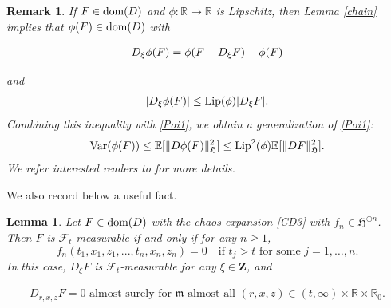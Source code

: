 \documentclass[letterpaper, 11pt,  reqno]{amsart}
\newtheorem{lemma}[theorem]{Lemma}
\newtheorem{remark}[theorem]{Remark}
\newcommand{\noi}{\noindent}
\newcommand{\R}{\mathbb{R}}
\newcommand{\bE}{\mathbb{E}}
\newcommand{\E}{\mathbb{E}}
\newcommand{\Lip}{\textup{Lip}}
\newcommand{\Var}{\textup{Var}}
\newcommand{\fm}{\mathfrak{m}}
\newcommand{\fH}{\mathfrak{H}}
\newcommand{\dom}{\textup{dom}}
\numberwithin{equation}{section}
\numberwithin{theorem}{section}
\begin{document}
\begin{remark}
 \label{rem_BZ-iii}
 \rm
If $F  \in\dom(D)$ and $\phi: \R\to\R$ is Lipschitz, then Lemma \ref{chain} implies that
 $\phi(F)\in\dom(D)$ with
 
 \noi
\begin{align}   \notag %
D_\xi \phi(F)=\phi(F+D_\xi F)-\phi(F) 
\end{align}

\noi
and 
\begin{align}\label{add1b}
|D_\xi \phi(F)| \leq  \Lip(\phi)| D_\xi F|.
\end{align}
Combining this inequality with \eqref{Poi1}, we obtain a generalization of \eqref{Poi1}:
\begin{align}   \notag %
\Var  ( \phi(F)  ) \leq  \bE[\|D \phi(F)\|_{\fH}^2]\leq \textup{Lip}^2(\phi) \E [ \| DF \|_\fH^2  ].
\end{align}
We refer  interested readers to \cite[Remark 2.7]{BZ23} for more details.





\end{remark}

We also record below a useful fact. 

\begin{lemma}


\label{rem_BZ-iv}
Let $F\in\dom(D)$ with the chaos expansion \eqref{CD3} with $f_n \in \fH^{\odot n}$.
 Then $F$ is $\mathcal{F}_t$-measurable if and only if for any $n\geq 1$, 
 \begin{equation}
 \label{fn-zero}
 f_n( t_1, x_1, z_1, ..., t_n, x_n, z_n) = 0 \quad\text{if $t_j > t$ for some $j=1,\ldots,n$.}
 \end{equation}
In this case,  $D_\xi F$ is $\mathcal{F}_t$-measurable for any $\xi \in \mathbf{Z} $, and

\noi
\begin{align} \label{D-zero}
D_{r,x,z}F=0  \,\, \mbox{almost surely} \,\, 
\mbox{for $\fm$-almost all $(r,x,z) \in (t,\infty) \times \R \times \R_0$}.
\end{align}


\end{lemma}
\end{document}
